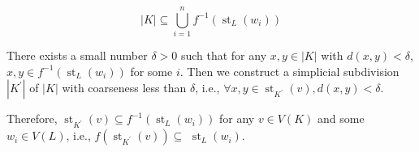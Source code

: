 \[
\left| K\right|  \subseteq  \mathop{\bigcup }\limits_{{i = 1}}^{n}{f}^{-1}\left( {{\operatorname{st}}_{L}\left( {w}_{i}\right) }\right)
\]

There exists a small number \(\delta  > 0\) such that for any \(x, y \in  \left| K\right|\) with \(d\left( {x, y}\right)  < \delta\), \(x, y \in  {f}^{-1}\left( {{\operatorname{st}}_{L}\left( {w}_{i}\right) }\right)\) for some \(i\). Then we construct a simplicial subdivision \(\left| {K}^{\prime }\right|\) of \(\left| K\right|\) with coarseness less than \(\delta\), i.e., \(\forall x, y \in  {\operatorname{st}}_{{K}^{\prime }}\left( v\right), d\left( {x, y}\right)  < \delta\).

Therefore, \({\operatorname{st}}_{{K}^{\prime }}\left( v\right)  \subseteq  {f}^{-1}\left( {{\operatorname{st}}_{L}\left( {w}_{i}\right) }\right)\) for any \(v \in  V\left( K\right)\) and some \({w}_{i} \in  V\left( L\right)\), i.e., \(f\left( {{\operatorname{st}}_{{K}^{\prime }}\left( v\right) }\right)  \subseteq\)  \({\operatorname{st}}_{L}\left( {w}_{i}\right)\).